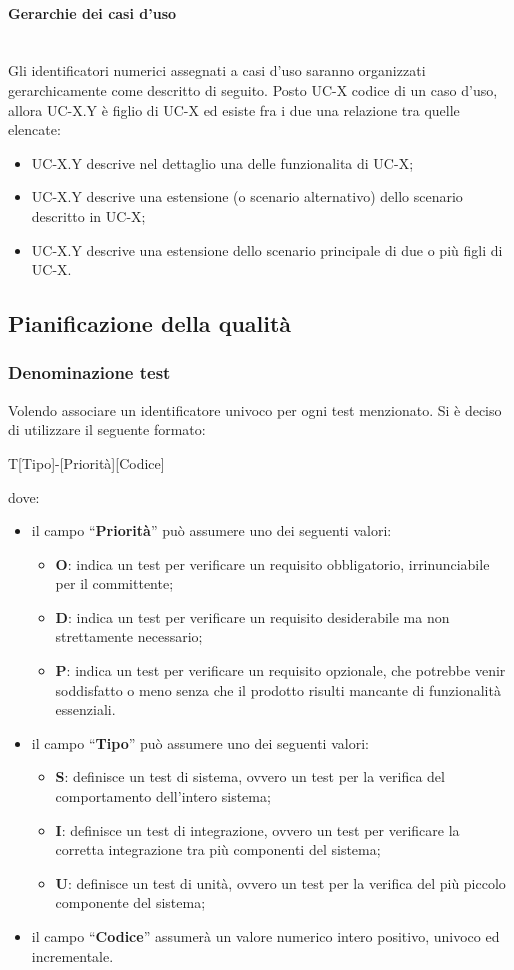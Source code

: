 \documentclass[11pt,a4paper]{article}
\begin{document}
\paragraph{Gerarchie dei casi d'uso} 
\noindent \\
 Gli identificatori numerici assegnati a casi d'uso saranno organizzati gerarchicamente come descritto di seguito. Posto UC-X codice di un caso d'uso, allora UC-X.Y è figlio di UC-X ed esiste fra i due una relazione tra quelle elencate:
\begin{itemize}
\item UC-X.Y descrive nel dettaglio una delle funzionalita di UC-X;
\item UC-X.Y descrive una estensione (o scenario alternativo) dello scenario descritto in UC-X; 
\item UC-X.Y descrive una estensione dello scenario principale di due o più figli di UC-X.
\end{itemize}
\subsection{Pianificazione della qualità}
\subsubsection{Denominazione test}
Volendo associare un identificatore univoco per ogni test menzionato. Si \`e deciso di utilizzare il seguente formato:
	\begin{center}
		T[Tipo]-[Priorità][Codice]
\end{center}
dove:
\begin{itemize}
\item il campo “\textbf{Priorità}” può assumere uno dei seguenti valori:
\begin{itemize}
	\item \textbf{O}: indica un test per verificare un requisito obbligatorio, irrinunciabile per il committente;
	\item \textbf{D}: indica un test per verificare un requisito desiderabile ma non strettamente necessario;
	\item \textbf{P}: indica un test per verificare un requisito opzionale, che potrebbe venir soddisfatto o meno senza che il prodotto risulti mancante di funzionalità essenziali.
\end{itemize}
\item il campo “\textbf{Tipo}” può assumere uno dei seguenti valori:
\begin{itemize}
	\item \textbf{S}: definisce un test di sistema, ovvero un test per la verifica del comportamento dell'intero sistema;
	\item \textbf{I}: definisce un test di integrazione, ovvero un test per verificare la corretta integrazione tra più componenti del sistema;
	\item \textbf{U}: definisce un test di unità, ovvero un test per la verifica del più piccolo componente del sistema;
\end{itemize}
\item il campo “\textbf{Codice}” assumerà un valore numerico intero positivo, univoco ed incrementale.
\end{itemize}
\newpage
	
\end{document}
